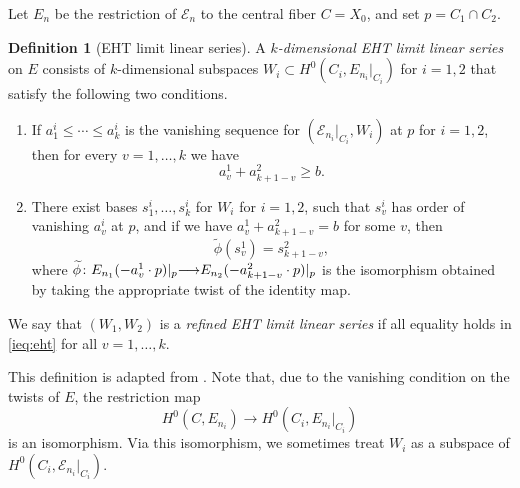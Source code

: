 \documentclass[11pt,reqno]{amsart}
\theoremstyle{plain}
\theoremstyle{definition}
\newtheorem{definition}[theorem]{Definition}
\theoremstyle{remark}
\numberwithin{equation}{section}
\renewcommand{\to}{{\longrightarrow}}
\numberwithin{equation}{section}
\begin{document}
Let $E_n$ be the restriction of $\mathcal E_n$ to the central fiber $C = X_0$, and set $p = C_1 \cap C_2$.
\begin{definition}[EHT limit linear series]
  \label{def:eht}
  A \emph{$k$-dimensional EHT limit linear series} on $E$ consists of $k$-dimensional subspaces $W_i \subset H^0(C_i, E_{n_i}|_{C_i})$ for $i = 1, 2$ that satisfy the following two conditions.
  \begin{enumerate}
  \item
    \label{ieq:eht}
    If $a^i_1 \leq \cdots \leq a^i_k$ is the vanishing sequence for $(\mathcal E_{n_i}|_{C_i}, W_i)$ at $p$ for $i = 1, 2$, then for every $v = 1, \dots, k$ we have
    \[ a^1_v + a^2_{k+1-v} \geq b.\]
  \item\label{gluing:eht}
    There exist bases $s^i_1, \dots, s^i_k$ for $W_i$ for $i = 1, 2$, such that $s^i_v$ has order of vanishing $a^i_v$ at $p$, and if we have $a^1_v + a^2_{k+1-v} = b$ for some $v$, then
    \[ \widetilde \phi (s^1_v) = s^2_{k+1-v},\]
    where $\widetilde \phi \from E_{n_1}(-a^1_{v}\cdot p)|_p \to E_{n_2}(-a^2_{k+1-v} \cdot p) |_p$ is the isomorphism obtained by taking the appropriate twist of the identity map.
  \end{enumerate}
  We say that $(W_1, W_2)$ is a \emph{refined EHT limit linear series} if all equality holds in \eqref{ieq:eht} for all $v = 1, \dots, k$.
\end{definition}
This definition is adapted from \cite[Definition~4.1.2]{oss:14}.
Note that, due to the vanishing condition on the twists of $E$, the restriction map
\[ H^0(C, E_{n_i}) \to H^0(C_i, E_{n_i}|_{C_i})\]
is an isomorphism.
Via this isomorphism, we sometimes treat $W_i$ as a subspace of $H^0(C_i, \mathcal E_{n_i}|_{C_i})$.
\end{document}
